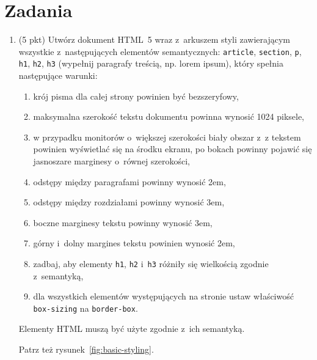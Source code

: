 \documentclass[12pt]{article}
\begin{document}
    \section*{Zadania}
    \begin{enumerate}
        \item\label{exc:basic-styling}
            (5 pkt) Utwórz dokument HTML~5 wraz z~arkuszem styli zawierającym wszystkie z~następujących elementów semantycznych: \texttt{article}, \texttt{section}, \texttt{p}, \texttt{h1}, \texttt{h2}, \texttt{h3} (wypełnij paragrafy treścią, np. lorem ipsum), który spełnia następujące warunki:
            \begin{enumerate}
                \item krój pisma dla całej strony powinien być bezszeryfowy,
                \item maksymalna szerokość tekstu dokumentu powinna wynosić 1024 piksele,
                \item w przypadku monitorów o~większej szerokości biały obszar z~z tekstem powinien wyświetlać się na środku ekranu, po bokach powinny pojawić się jasnoszare marginesy o~równej szerokości,
                \item odstępy między paragrafami powinny wynosić 2em,
                \item odstępy między rozdziałami powinny wynosić 3em,
                \item boczne marginesy tekstu powinny wynosić 3em,
                \item górny i~dolny margines tekstu powinien wynosić 2em,
                \item zadbaj, aby elementy \texttt{h1}, \texttt{h2} i~\texttt{h3} różniły się wielkością zgodnie z~semantyką,
                \item dla wszystkich elementów występujących na stronie ustaw właściwość \texttt{box-sizing} na \texttt{border-box}.
            \end{enumerate}

            Elementy HTML muszą być użyte zgodnie z~ich semantyką.

            Patrz też rysunek~\ref{fig:basic-styling}.


\end{enumerate}
\end{document}

